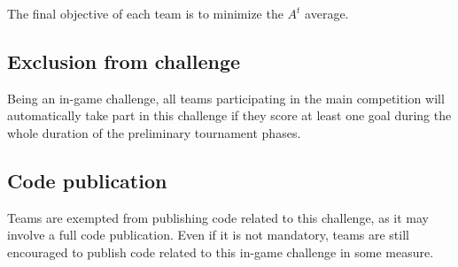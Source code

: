 The final objective of each team is to minimize the $A^t$ average.

\subsection{Exclusion from challenge}
Being an in-game challenge, all teams participating in the main competition will automatically take part in this challenge if they score at least one goal during the whole duration of the preliminary tournament phases.

\subsection{Code publication}
Teams are exempted from publishing code related to this challenge, as it may involve a full code publication. Even if it is not mandatory, teams are still encouraged to publish code related to this in-game challenge in some measure.
